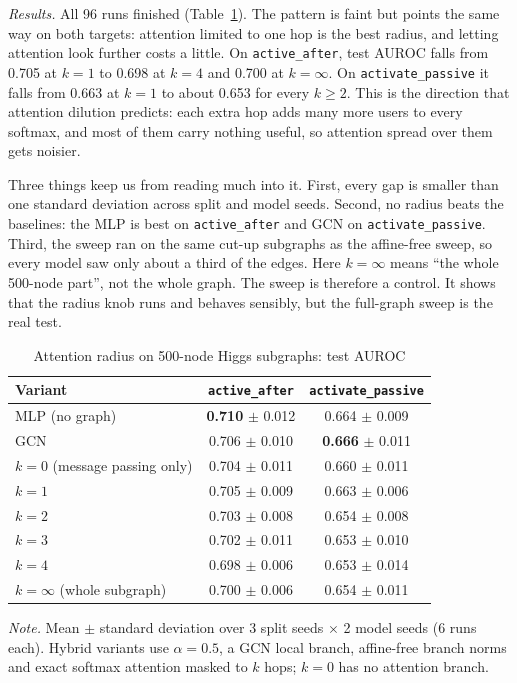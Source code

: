 \emph{Results.} All 96 runs finished (Table~\ref{tab:higgsradius}). The pattern is faint but points the same way on both targets: attention limited to one hop is the best radius, and letting attention look further costs a little. On \texttt{active\_\allowbreak after}, test AUROC falls from 0.705 at $k=1$ to 0.698 at $k=4$ and 0.700 at $k=\infty$. On \texttt{activate\_\allowbreak passive} it falls from 0.663 at $k=1$ to about 0.653 for every $k\ge2$. This is the direction that attention dilution predicts: each extra hop adds many more users to every softmax, and most of them carry nothing useful, so attention spread over them gets noisier.

Three things keep us from reading much into it. First, every gap is smaller than one standard deviation across split and model seeds. Second, no radius beats the baselines: the MLP is best on \texttt{active\_\allowbreak after} and GCN on \texttt{activate\_\allowbreak passive}. Third, the sweep ran on the same cut-up subgraphs as the affine-free sweep, so every model saw only about a third of the edges. Here $k=\infty$ means ``the whole 500-node part'', not the whole graph. The sweep is therefore a control. It shows that the radius knob runs and behaves sensibly, but the full-graph sweep is the real test.

\begin{table}[htbp]
\caption{Attention radius on 500-node Higgs subgraphs: test AUROC}
\label{tab:higgsradius}
\centering\small
\begin{tabular}{@{}lcc@{}}
\toprule
Variant & \texttt{active\_after} & \texttt{activate\_passive} \\
\midrule
MLP (no graph) & \textbf{0.710} $\pm$ 0.012 & 0.664 $\pm$ 0.009 \\
GCN & 0.706 $\pm$ 0.010 & \textbf{0.666} $\pm$ 0.011 \\
$k=0$ (message passing only) & 0.704 $\pm$ 0.011 & 0.660 $\pm$ 0.011 \\
$k=1$ & 0.705 $\pm$ 0.009 & 0.663 $\pm$ 0.006 \\
$k=2$ & 0.703 $\pm$ 0.008 & 0.654 $\pm$ 0.008 \\
$k=3$ & 0.702 $\pm$ 0.011 & 0.653 $\pm$ 0.010 \\
$k=4$ & 0.698 $\pm$ 0.006 & 0.653 $\pm$ 0.014 \\
$k=\infty$ (whole subgraph) & 0.700 $\pm$ 0.006 & 0.654 $\pm$ 0.011 \\
\bottomrule
\end{tabular}

\vspace{4pt}
\parbox{0.85\textwidth}{\footnotesize\textit{Note.} Mean $\pm$ standard deviation over 3 split seeds $\times$ 2 model seeds (6 runs each). Hybrid variants use $\alpha=0.5$, a GCN local branch, affine-free branch norms and exact softmax attention masked to $k$ hops; $k=0$ has no attention branch.}
\end{table}

